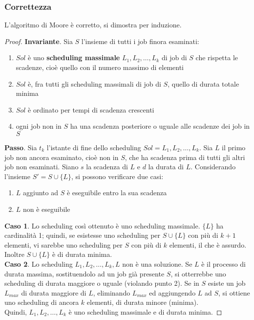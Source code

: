 \documentclass[11pt]{article}
\begin{document}
\subsubsection{Correttezza}
L'algoritmo di Moore è corretto, si dimostra per induzione.
\begin{proof}
    \textbf{Invariante}. Sia $S$ l'insieme di tutti i job finora esaminati:
    \begin{enumerate}
        \item $Sol$ è uno \textbf{scheduling massimale} $L_1,L_2,\dots,L_k$ di job di $S$ che rispetta le scadenze, cioè 
        quello con il numero massimo di elementi 
        \item $Sol$ è, fra tutti gli scheduling massimali di job di $S$, quello di durata totale minima 
        \item $Sol$ è ordinato per tempi di scadenza crescenti
        \item ogni job non in $S$ ha una scadenza posteriore o uguale alle scadenze dei job in $S$ 
    \end{enumerate}
    \textbf{Passo}. Sia $t_k$ l'istante di fine dello scheduling $Sol=L_1,L_2,\dots,L_k$. Sia $L$ il primo job non ancora 
    esaminato, cioè non in $S$, che ha scadenza prima di tutti gli altri job non esaminati. Siano $s$ la scadenza di $L$ 
    e $d$ la durata di $L$. Considerando l'insieme $S'=S\cup \{L\}$, si possono verificare due casi:
    \begin{enumerate}
        \item $L$ aggiunto ad $S$ è eseguibile entro la sua scadenza 
        \item $L$ non è eseguibile
    \end{enumerate}
    \textbf{Caso 1}. Lo scheduling così ottenuto è uno scheduling massimale. $\{L\}$ ha cardinalità 1; quindi, se esistesse 
    uno scheduling per $S\cup \{L\}$ con più di $k+1$ elementi, vi sarebbe uno scheduling per $S$ con più di $k$ elementi,
    il che è assurdo. Inoltre $S\cup \{L\}$ è di durata minima.\\ 
    \textbf{Caso 2}. Lo scheduling $L_1,L_2,\dots,L_k,L$ non è una soluzione. Se $L$ è il processo di durata massima, sostituendolo 
    ad un job già presente $S$, si otterrebbe uno scheduling di durata maggiore o uguale (violando punto 2). Se in $S$ 
    esiste un job $L_{max}$ di durata maggiore di $L$, eliminando $L_{max}$ ed aggiungendo $L$ ad $S$, si ottiene uno 
    scheduling di ancora $k$ elementi, di durata minore (minima).\\
    Quindi, $L_1,L_2,\dots,L_k$ è uno scheduling massimale e di durata minima.
\end{proof}
\end{document}
